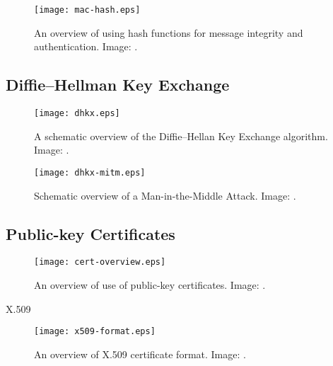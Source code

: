\documentclass{beamer}
\begin{document}
\begin{frame}{\insertsubsectionhead}
  \begin{figure}
    \texttt{[image: mac-hash.eps]}
    \caption{An overview of using hash functions for message integrity and 
      authentication.
      Image: \cite{Stallings2013nse}.
    }
  \end{figure}
\end{frame}

\subsection{Diffie--Hellman Key Exchange}

\begin{frame}{\insertsubsectionhead}
  \begin{figure}
    \texttt{[image: dhkx.eps]}
    \caption{A schematic overview of the Diffie--Hellan Key Exchange algorithm.
      Image: \cite{Stallings2013nse}.
    }
  \end{figure}
\end{frame}

\begin{frame}{\insertsubsectionhead}
  \begin{figure}
    \texttt{[image: dhkx-mitm.eps]}
    \caption{Schematic overview of a Man-in-the-Middle Attack.
      Image: \cite{Stallings2013nse}.
    }
  \end{figure}
\end{frame}

\subsection{Public-key Certificates}

\begin{frame}{\insertsubsectionhead}
  \begin{figure}
    \texttt{[image: cert-overview.eps]}
    \caption{An overview of use of public-key certificates.
      Image: \cite{Stallings2013nse}.
    }
  \end{figure}
\end{frame}

\begin{frame}{\insertsubsectionhead}{X.509}
  \begin{figure}
    \texttt{[image: x509-format.eps]}
    \caption{An overview of X.509 certificate format.
      Image: \cite{Stallings2013nse}.
    }
  \end{figure}
\end{frame}
\end{document}
